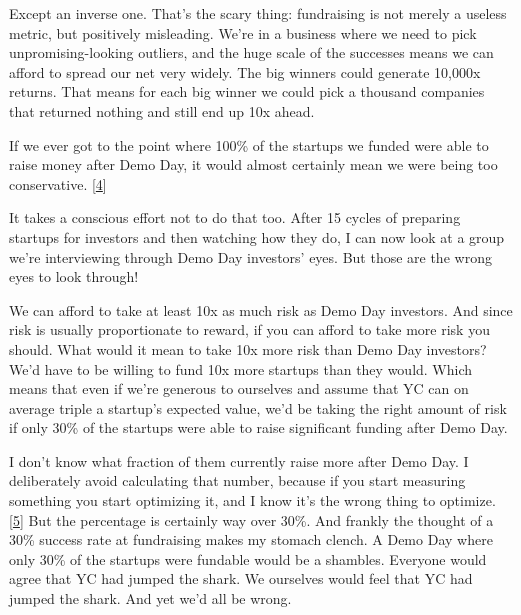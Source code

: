 Except an inverse
                    one. That's the scary thing: fundraising is not merely a
                    useless metric, but positively misleading. We're in a
                    business where we need to pick unpromising-looking outliers,
                    and the huge scale of the successes means we can afford to
                    spread our net very widely. The big winners could generate
                    10,000x returns. That means for each big winner we could
                    pick a thousand companies that returned nothing and still
                    end up 10x ahead.

If we ever got to the point
                    where 100\% of the startups we funded were able to raise
                    money after Demo Day, it would almost certainly mean we were
                    being too conservative.
                    [\href{\#f4n}{4}]

It takes a conscious effort not to do that too.
                    After 15 cycles of preparing startups for investors and then
                    watching how they do, I can now look at a group we're
                    interviewing through Demo Day investors' eyes. But those are
                    the wrong eyes to look through!

We can afford to
                    take at least 10x as much risk as Demo Day investors. And
                    since risk is usually proportionate to reward, if you can
                    afford to take more risk you should. What would it mean to
                    take 10x more risk than Demo Day investors? We'd have to be
                    willing to fund 10x more startups than they would. Which
                    means that even if we're generous to ourselves and assume
                    that YC can on average triple a startup's expected value,
                    we'd be taking the right amount of risk if only 30\% of the
                    startups were able to raise significant funding after Demo
                    Day.

I don't know what fraction of them currently
                    raise more after Demo Day. I deliberately avoid calculating
                    that number, because if you start measuring something you
                    start optimizing it, and I know it's the wrong thing to
                    optimize.
                    [\href{\#f5n}{5}]
                    But the percentage is certainly way over 30\%. And frankly
                    the thought of a 30\% success rate at fundraising makes my
                    stomach clench. A Demo Day where only 30\% of the startups
                    were fundable would be a shambles. Everyone would agree that
                    YC had jumped the shark. We ourselves would feel that YC had
                    jumped the shark. And yet we'd all be wrong.

